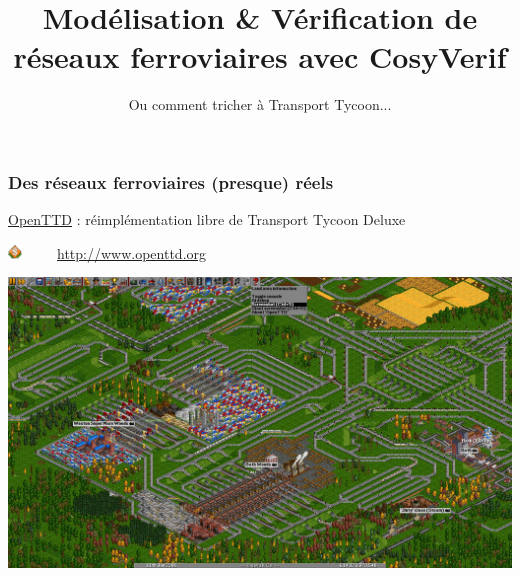 \documentclass[french]{beamer}
\title{Modélisation \& Vérification de réseaux ferroviaires avec CosyVerif}
\subtitle{Ou comment tricher à Transport Tycoon...}
\begin{document}
\begin{frame}
\maketitle
\end{frame}

\begin{frame}
  \frametitle{Des réseaux ferroviaires (presque) réels}
  \begin{center}
  \href{http://www.openttd.org}{OpenTTD} : réimplémentation libre de Transport Tycoon Deluxe

  \includegraphics[height=1em]{images/openttd-64.png}~~~~~\url{http://www.openttd.org}

  \bigskip
  \includegraphics[width=.95\textwidth]{images/screen.png}  
  \end{center}
\end{frame}
\end{document}
